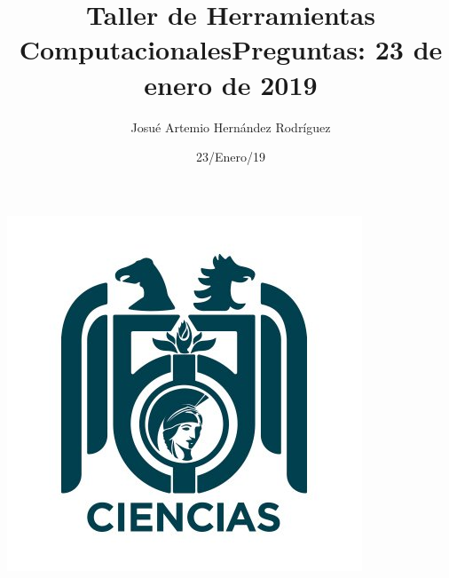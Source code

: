 \documentclass[letterpaper, 12pt, oneside]{article}%
\title{\Huge Taller de Herramientas Computacionales}
\author{Josué Artemio Hernández Rodríguez}%
\date{23/Enero/19}%
\begin{document}
\maketitle
\begin{center}%
\includegraphics[scale=.6]{3.jpg}%
\end{center}%
\newpage%

\title{\huge Preguntas: 23 de enero de 2019\\}%
\end{document}
